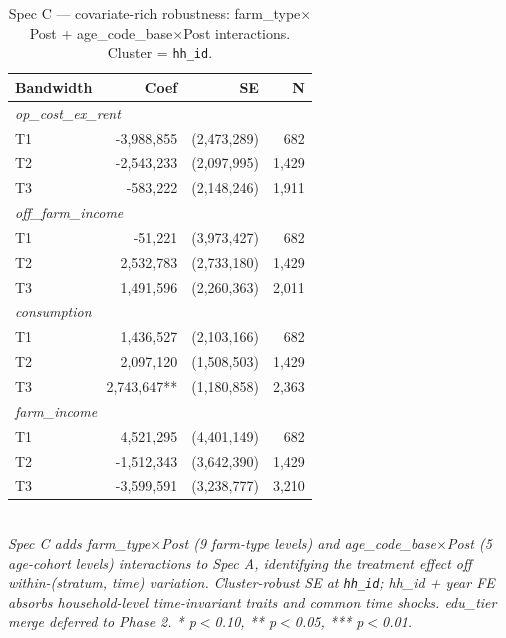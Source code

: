 \begin{table}[t]
\centering
\caption{Spec C — covariate-rich robustness: farm\_type$\times$Post + age\_code\_base$\times$Post interactions. Cluster = \texttt{hh\_id}.}
\label{tab:specC}
\begin{tabular}{lrrr}
\toprule
Bandwidth & Coef & SE & N \\
\midrule
\multicolumn{4}{l}{\textit{op\_cost\_ex\_rent}} \\
T1 & -3,988,855 & (2,473,289) & 682 \\
T2 & -2,543,233 & (2,097,995) & 1,429 \\
T3 & -583,222 & (2,148,246) & 1,911 \\
\multicolumn{4}{l}{\textit{off\_farm\_income}} \\
T1 & -51,221 & (3,973,427) & 682 \\
T2 & 2,532,783 & (2,733,180) & 1,429 \\
T3 & 1,491,596 & (2,260,363) & 2,011 \\
\multicolumn{4}{l}{\textit{consumption}} \\
T1 & 1,436,527 & (2,103,166) & 682 \\
T2 & 2,097,120 & (1,508,503) & 1,429 \\
T3 & 2,743,647** & (1,180,858) & 2,363 \\
\multicolumn{4}{l}{\textit{farm\_income}} \\
T1 & 4,521,295 & (4,401,149) & 682 \\
T2 & -1,512,343 & (3,642,390) & 1,429 \\
T3 & -3,599,591 & (3,238,777) & 3,210 \\
\bottomrule
\end{tabular}
\\
\footnotesize\textit{Spec C adds farm\_type$\times$Post (9 farm-type levels) and age\_code\_base$\times$Post (5 age-cohort levels) interactions to Spec A, identifying the treatment effect off within-(stratum, time) variation. Cluster-robust SE at \texttt{hh\_id}; hh\_id + year FE absorbs household-level time-invariant traits and common time shocks. edu\_tier merge deferred to Phase 2. * p$<$0.10, ** p$<$0.05, *** p$<$0.01.}
\end{table}
